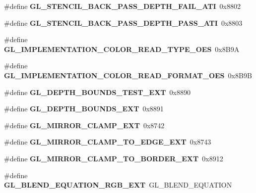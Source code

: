 \begin{DoxyCompactItemize}
\item 
\#define {\bfseries G\+L\+\_\+\+S\+T\+E\+N\+C\+I\+L\+\_\+\+B\+A\+C\+K\+\_\+\+P\+A\+S\+S\+\_\+\+D\+E\+P\+T\+H\+\_\+\+F\+A\+I\+L\+\_\+\+A\+T\+I}~0x8802\label{_s_d_l__opengl_8h_a13500d38d7d905dfeaaadffd83611a1c}

\item 
\#define {\bfseries G\+L\+\_\+\+S\+T\+E\+N\+C\+I\+L\+\_\+\+B\+A\+C\+K\+\_\+\+P\+A\+S\+S\+\_\+\+D\+E\+P\+T\+H\+\_\+\+P\+A\+S\+S\+\_\+\+A\+T\+I}~0x8803\label{_s_d_l__opengl_8h_ac384dade0b97791c276e1e6b8de7cd2b}

\item 
\#define {\bfseries G\+L\+\_\+\+I\+M\+P\+L\+E\+M\+E\+N\+T\+A\+T\+I\+O\+N\+\_\+\+C\+O\+L\+O\+R\+\_\+\+R\+E\+A\+D\+\_\+\+T\+Y\+P\+E\+\_\+\+O\+E\+S}~0x8\+B9\+A\label{_s_d_l__opengl_8h_a8473c4a073707e095a120939de36babd}

\item 
\#define {\bfseries G\+L\+\_\+\+I\+M\+P\+L\+E\+M\+E\+N\+T\+A\+T\+I\+O\+N\+\_\+\+C\+O\+L\+O\+R\+\_\+\+R\+E\+A\+D\+\_\+\+F\+O\+R\+M\+A\+T\+\_\+\+O\+E\+S}~0x8\+B9\+B\label{_s_d_l__opengl_8h_a8280ea27ca8dc4ce7e62cd70416f6108}

\item 
\#define {\bfseries G\+L\+\_\+\+D\+E\+P\+T\+H\+\_\+\+B\+O\+U\+N\+D\+S\+\_\+\+T\+E\+S\+T\+\_\+\+E\+X\+T}~0x8890\label{_s_d_l__opengl_8h_aff4d49c866f8ddd0c9eaada7e56c3dda}

\item 
\#define {\bfseries G\+L\+\_\+\+D\+E\+P\+T\+H\+\_\+\+B\+O\+U\+N\+D\+S\+\_\+\+E\+X\+T}~0x8891\label{_s_d_l__opengl_8h_a48c74c7c243ce738a109bcc788a11da8}

\item 
\#define {\bfseries G\+L\+\_\+\+M\+I\+R\+R\+O\+R\+\_\+\+C\+L\+A\+M\+P\+\_\+\+E\+X\+T}~0x8742\label{_s_d_l__opengl_8h_a613e98533d38bf4a5ed5ca6a96db0fff}

\item 
\#define {\bfseries G\+L\+\_\+\+M\+I\+R\+R\+O\+R\+\_\+\+C\+L\+A\+M\+P\+\_\+\+T\+O\+\_\+\+E\+D\+G\+E\+\_\+\+E\+X\+T}~0x8743\label{_s_d_l__opengl_8h_a43e8af11a012de96eb54192b88365b53}

\item 
\#define {\bfseries G\+L\+\_\+\+M\+I\+R\+R\+O\+R\+\_\+\+C\+L\+A\+M\+P\+\_\+\+T\+O\+\_\+\+B\+O\+R\+D\+E\+R\+\_\+\+E\+X\+T}~0x8912\label{_s_d_l__opengl_8h_a8814d563b06eea0af82fef7f1c7c6db1}

\item 
\#define {\bfseries G\+L\+\_\+\+B\+L\+E\+N\+D\+\_\+\+E\+Q\+U\+A\+T\+I\+O\+N\+\_\+\+R\+G\+B\+\_\+\+E\+X\+T}~G\+L\+\_\+\+B\+L\+E\+N\+D\+\_\+\+E\+Q\+U\+A\+T\+I\+O\+N\label{_s_d_l__opengl_8h_a8375cbf4cbf6a5cac207c1a2691f5620}


\end{DoxyCompactItemize}
